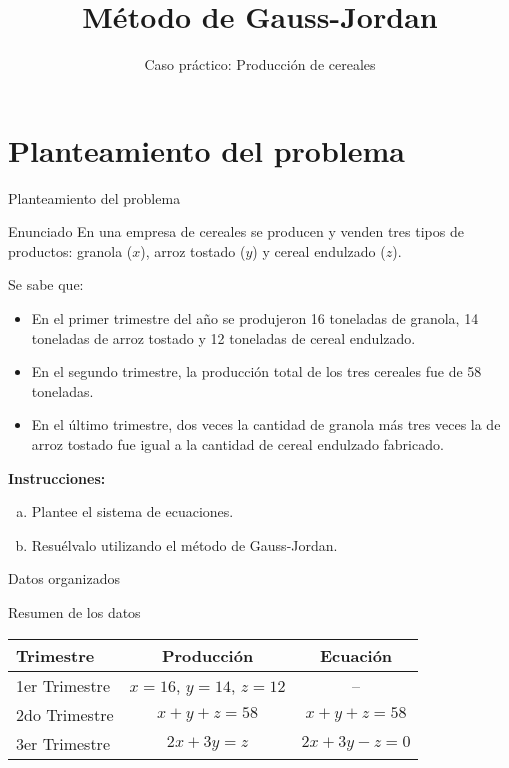 \documentclass{beamer}
\title{Método de Gauss-Jordan}
\subtitle{Caso práctico: Producción de cereales}
\begin{document}
\section{Planteamiento del problema}

\begin{frame}{Planteamiento del problema}
\begin{block}{Enunciado}
\footnotesize
En una empresa de cereales se producen y venden tres tipos de productos: granola ($x$), arroz tostado ($y$) y cereal endulzado ($z$).

Se sabe que:

\begin{itemize}
    \item En el primer trimestre del año se produjeron 16 toneladas de granola, 14 toneladas de arroz tostado y 12 toneladas de cereal endulzado.
    \item En el segundo trimestre, la producción total de los tres cereales fue de 58 toneladas.
    \item En el último trimestre, dos veces la cantidad de granola más tres veces la de arroz tostado fue igual a la cantidad de cereal endulzado fabricado.
\end{itemize}

\textbf{Instrucciones:}
\begin{enumerate}[a.]
    \item Plantee el sistema de ecuaciones.
    \item Resuélvalo utilizando el método de Gauss-Jordan.
\end{enumerate}
\end{block}
\end{frame}

\begin{frame}{Datos organizados}
\begin{block}{Resumen de los datos}
\begin{table}[h]
\centering
\renewcommand{\arraystretch}{1.4}
\begin{tabular}{lcc}
\toprule
\textbf{Trimestre} & \textbf{Producción} & \textbf{Ecuación} \\
\midrule
1er Trimestre & $x=16$, $y=14$, $z=12$ & -- \\
2do Trimestre & $x+y+z=58$ & $x + y + z = 58$ \\
3er Trimestre & $2x + 3y = z$ & $2x + 3y - z = 0$ \\
\bottomrule
\end{tabular}
\end{table}
\end{block}
\end{frame}
\end{document}
